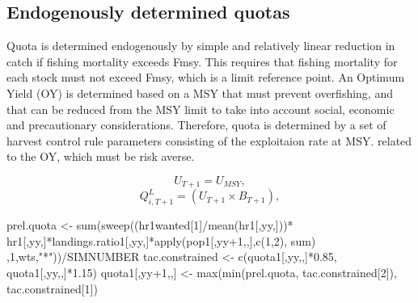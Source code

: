 \documentclass[12pt,oneline,a4paper,numbib]{ouparticle}
\begin{document}



\subsection{Endogenously determined quotas}
\label{sec2.3}

Quota is determined endogenously by simple and relatively linear reduction in catch if fishing mortality exceeds Fmsy. This requires that fishing mortality for each stock must not exceed Fmsy, which is a limit reference point. An Optimum Yield (OY) is determined based on a MSY that must prevent overfishing, and that can be reduced from the MSY limit to take into account social, economic and precautionary considerations.  Therefore, quota is determined by a set of harvest control rule parameters consisting of the exploitaion rate at MSY.
related to the OY, which must be risk averse. 

\begin{equation*}
 U_{T+1} = U_{MSY}, 
\end{equation*}
\begin{equation*}
 Q_{i, T+1}^{L} = (U_{T+1}\times B_{T+1}),
\end{equation*}



prel.quota <-  sum(sweep((hr1wanted[1]/mean(hr1[,yy,]))* hr1[,yy,]*landings.ratio1[,yy,]*apply(pop1[,yy+1,,],c(1,2), sum) ,1,wts,"*"))/SIMNUMBER
        tac.constrained <- c(quota1[,yy,,]*0.85, quota1[,yy,,]*1.15)
        quota1[,yy+1,,] <- max(min(prel.quota, tac.constrained[2]), tac.constrained[1])
        
\end{document}
